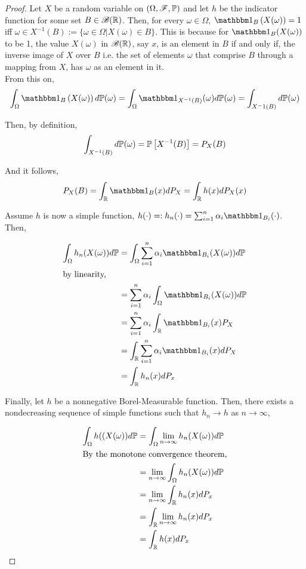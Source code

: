\documentclass[../TGMAFFIRO.tex]{subfiles}
\begin{document}
\begin{proof}
Let $X$ be a random variable on $(\Omega, \mathscr{F}, \mathbb{P})$ and let $h$ be the indicator function for some set $B \in \mathscr{B}(\mathbb{R})$. Then, for every $\omega \in \Omega$, $\ind_B\left(X(\omega) \right) = 1$ iff $\omega \in X^{-1}(B) := \{\omega \in \Omega | X(\omega) \in B\}$. This is because for $\ind_B(X(\omega))$ to be 1, the value $X(\omega)$ in $\mathscr{B}(\mathbb{R})$, say $x$, is an element in $B$ if and only if, the inverse image of $X$ over $B$ i.e. the set of elements $\omega$ that comprise $B$ through a mapping from $X$, has $\omega$ as an element in it.\\

From this on,
\begin{equation*}
	\int_\Omega \ind_B\left(X(\omega)\right) d\Pm(\omega) = \int_\Omega \ind_{X^{-1}(B)} (\omega) d\Pm(\omega) = \int_{X{^-1}(B)} d\Pm(\omega)
\end{equation*}

Then, by definition,
\begin{equation}
	\int_{X^{-1}(B)} d\mathbb{P}(\omega) = \mathbb{P}\left[X^{-1}(B)\right] = P_X(B)
\end{equation}

And it follows,
\begin{equation*}
	P_X(B) = \int_\RNums \ind_{B}(x) dP_X = \int_\RNums h(x) dP_X(x)
\end{equation*}

Assume $h$ is now a simple function, $h(\cdot) =: h_n(\cdot) = \sum_{i=1}^n \alpha_i\ind_{B_i}(\cdot)$. Then,

\begin{align*}
	\int_\Omega h_n (X(\omega)) d\Pm &= \int_\Omega \sum_{i=1}^{n}\alpha_i \ind_{B_i}(X(\omega)) d\Pm\\
	\intertext{by linearity,}
	&= \sum_{i=1}^{n}\alpha_i\int_\Omega\ind_{B_i}(X(\omega)) d\Pm\\
	&= \sum_{i=1}^n\alpha_i\int_\RNums\ind_{B_i}(x) P_X\\
	&= \int_\RNums\sum_{i=1}^n\alpha_i\ind_{B_i}(x) dP_X\\
	&= \int_\RNums h_n(x) dP_x
\end{align*}

Finally, let $h$ be a nonnegative Borel-Measurable function. Then, there exists a nondecreasing sequence of simple functions such that $h_n \to h$ as $n \to \infty$,

\begin{align*}
	\int_\Omega h((X(\omega)) d\mathbb{P} &= \int_\Omega \lim_{n\to\infty} h_n(X(\omega)) d\mathbb{P} \\
	\intertext{By the monotone convergence theorem,}
	&= \lim_{n\to\infty} \int_\Omega h_n(X(\omega)) d\mathbb{P}\\
	&= \lim_{n\to\infty} \int_{\mathbb{R}} h_n(x) dP_x\\
	&= \int_{\mathbb{R}} \lim_{n\to\infty} h_n(x) dP_x\\
	&= \int_{\mathbb{R}} h(x) dP_x
\end{align*}
\end{proof}
\end{document}
